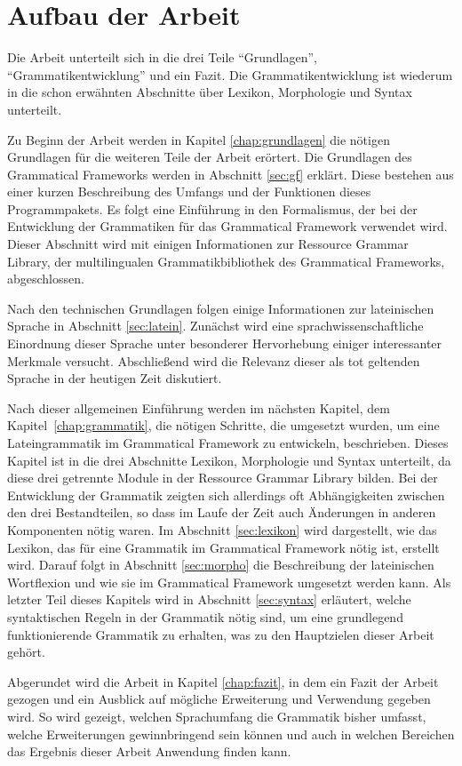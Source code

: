 \section{Aufbau der Arbeit}
\label{sec:aufbau}
Die Arbeit unterteilt sich in die drei Teile "`Grundlagen"', "`Grammatikentwicklung"' und ein Fazit. Die Grammatikentwicklung ist wiederum in die schon erwähnten Abschnitte über Lexikon, Morphologie und Syntax unterteilt. \par
Zu Beginn der Arbeit werden in Kapitel \ref{chap:grundlagen} die nötigen Grundlagen für die weiteren Teile der Arbeit erörtert. Die Grundlagen des Grammatical Frameworks werden in Abschnitt \ref{sec:gf} erklärt. Diese bestehen aus einer kurzen Beschreibung des Umfangs und der Funktionen dieses Programmpakets. Es folgt eine Einführung in den Formalismus, der bei der Entwicklung der Grammatiken für das Grammatical Framework verwendet wird. Dieser Abschnitt wird mit einigen Informationen zur Ressource Grammar Library, der multilingualen Grammatikbibliothek des Grammatical Frameworks, abgeschlossen. \par
Nach den technischen Grundlagen folgen einige Informationen zur lateinischen Sprache in Abschnitt \ref{sec:latein}. Zunächst wird eine sprachwissenschaftliche Einordnung dieser Sprache unter besonderer Hervorhebung einiger interessanter Merkmale versucht. Abschließend wird die Relevanz dieser als tot geltenden Sprache in der heutigen Zeit diskutiert. \par
Nach dieser allgemeinen Einführung werden im nächsten Kapitel, dem \mbox{Kapitel \ref{chap:grammatik}}, die nötigen Schritte, die umgesetzt wurden, um eine Lateingrammatik im Grammatical Framework zu entwickeln, beschrieben. Dieses Kapitel ist in die drei Abschnitte Lexikon, Morphologie und Syntax unterteilt, da diese drei getrennte Module in der Ressource Grammar Library bilden. Bei der Entwicklung der Grammatik zeigten sich allerdings oft Abhängigkeiten zwischen den drei Bestandteilen, so dass im Laufe der Zeit auch Änderungen in anderen Komponenten nötig waren. Im Abschnitt \ref{sec:lexikon} wird dargestellt, wie das Lexikon, das für eine Grammatik im Grammatical Framework nötig ist, erstellt wird. Darauf folgt in Abschnitt \ref{sec:morpho} die Beschreibung der lateinischen Wortflexion und wie sie im Grammatical Framework umgesetzt werden kann. Als letzter Teil dieses Kapitels wird in Abschnitt \ref{sec:syntax} erläutert, welche syntaktischen Regeln in der Grammatik nötig sind, um eine grundlegend funktionierende Grammatik zu erhalten, was zu den Hauptzielen dieser Arbeit gehört. \par
Abgerundet wird die Arbeit in Kapitel \ref{chap:fazit}, in dem ein Fazit der Arbeit gezogen und ein Ausblick auf mögliche Erweiterung und Verwendung gegeben wird. So wird gezeigt, welchen Sprachumfang die Grammatik bisher umfasst, welche Erweiterungen gewinnbringend sein können und auch in welchen Bereichen das Ergebnis dieser Arbeit Anwendung finden kann.
